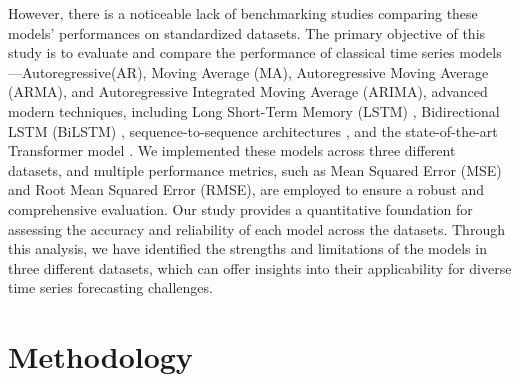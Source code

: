\documentclass[sn-mathphys-num]{sn-jnl}
\theoremstyle{thmstyleone}%
\theoremstyle{thmstyletwo}%
\theoremstyle{thmstylethree}%
\begin{document}
However, there is a noticeable lack of benchmarking studies comparing these models' performances on standardized datasets. The primary objective of this study is to evaluate and compare the performance of classical time series models \cite{box2015time}—Autoregressive(AR), Moving Average (MA), Autoregressive Moving Average (ARMA), and Autoregressive Integrated Moving Average (ARIMA), advanced modern techniques, including Long Short-Term Memory (LSTM) \cite{hochreiter1997lstm}, Bidirectional LSTM (BiLSTM) \cite{graves2005framewise}, sequence-to-sequence architectures \cite{sutskever2014seq2seq}, and the state-of-the-art Transformer model \cite{vaswani2017attention}. We implemented these models across three different datasets, and multiple performance metrics, such as Mean Squared Error (MSE) and Root Mean Squared Error (RMSE), are employed to ensure a robust and comprehensive evaluation. Our study provides a quantitative foundation for assessing the accuracy and reliability of each model across the datasets. Through this analysis, we have identified the strengths and limitations of the models in three different datasets, which can offer insights into their applicability for diverse time series forecasting challenges.

\section{Methodology}
\end{document}
